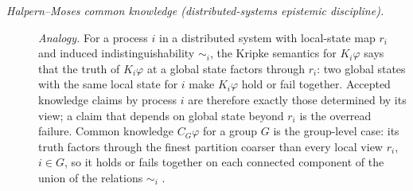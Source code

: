 \begin{description}
\item[\emph{Halpern--Moses common knowledge (distributed-systems
epistemic discipline).}] \textit{Analogy.}
For a process \(i\) in a distributed system with local-state map
\(r_i\) and induced indistinguishability \(\sim_i\), the Kripke
semantics for \(K_i\varphi\) says that the truth of
\(K_i\varphi\) at a global state factors through \(r_i\): two
global states with the same local state for \(i\) make
\(K_i\varphi\) hold or fail together.  Accepted knowledge claims
by process \(i\) are therefore exactly those determined by its
view; a claim that depends on global state beyond \(r_i\) is the
overread failure.  Common knowledge \(C_G\varphi\) for a group \(G\)
is the group-level case: its truth factors through the finest
partition coarser than every local view \(r_i\), \(i\in G\), so it
holds or fails together on each connected component of the union of
the relations \(\sim_i\)
\citep{HalpernMoses1990KnowledgeCommonKnowledge}.
\end{description}
\endgroup

